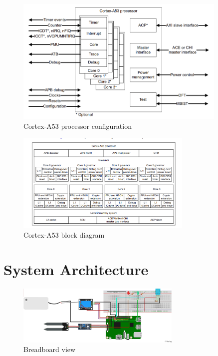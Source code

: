 \documentclass[12pt]{article}
\begin{document}
\begin{figure}[ht]
    \centering
    \includegraphics[width=0.9\textwidth]{images/image3.png}
    \caption{Cortex-A53 processor configuration}
    \label{fig:pic3}
\end{figure} 

\begin{figure}[ht]
    \centering
    \includegraphics[width=0.75\textwidth]{images/image9.png}
    \caption{Cortex-A53 block diagram}
    \label{fig:pic4}
\end{figure} 

\newpage
\section{System Architecture}

\begin{figure}[ht]
    \centering
    \includegraphics[width=0.7\textwidth]{images/image18.png}
    \caption{Breadboard view}
    \label{fig:pic5}
\end{figure} 
\end{document}
